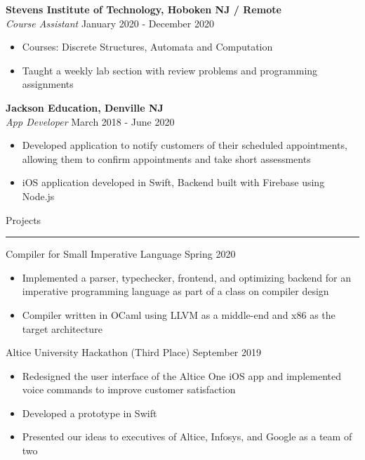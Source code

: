 \documentclass{article}
\newcommand \spacingBetweenHeadings {0.5em}
\begin{document}
\noindent
\textbf{Stevens Institute of Technology, Hoboken NJ / Remote}\\
\textit{Course Assistant}
\hfill
January 2020 - December 2020\\
\vspace{-1em}
\begin{itemize}
\item Courses: Discrete Structures, Automata and Computation
\item Taught a weekly lab section with review problems and programming assignments
\end{itemize}


\noindent
\textbf{Jackson Education, Denville NJ}\\
\textit{App Developer}
\hfill
March 2018 - June 2020\\
\vspace{-1em}
\begin{itemize}
\item Developed application to notify customers of their scheduled appointments, allowing them to \mbox{confirm} appointments and take short assessments
\item iOS application developed in Swift, Backend built with Firebase using Node.js
\end{itemize}


\vspace{\spacingBetweenHeadings}

\noindent
\huge Projects\par
\vspace{0.1em}
\hrule
\Large
\vspace{1em}
\noindent
Compiler for Small Imperative Language
\hfill
Spring 2020\\
\vspace{-1em}
\begin{itemize}
\item Implemented a parser, typechecker, frontend, and optimizing backend for an imperative programming language as part of a class on compiler design
\item Compiler written in OCaml using LLVM as a middle-end and x86 as the target architecture
\end{itemize}

\noindent
Altice University Hackathon (Third Place)
\hfill
September 2019\\
\vspace{-1em}
\begin{itemize}
\item Redesigned the user interface of the Altice One iOS app and implemented voice commands to improve customer satisfaction
\item Developed a prototype in Swift
\item Presented our ideas to executives of Altice, Infosys, and Google as a team of two
\end{itemize}
\end{document}
